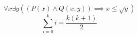 \documentclass{article}
\begin{document}
	\begin{equation}
	\forall x \exists y \left (\left ( P(x) \wedge Q(x, y) \right ) \implies x \le \sqrt{y} \right )
	\end{equation}
	\begin{equation}
	\sum_{i=0}^{k} i = \frac{k(k+1)}{2}
	\end{equation}
\end{document}

